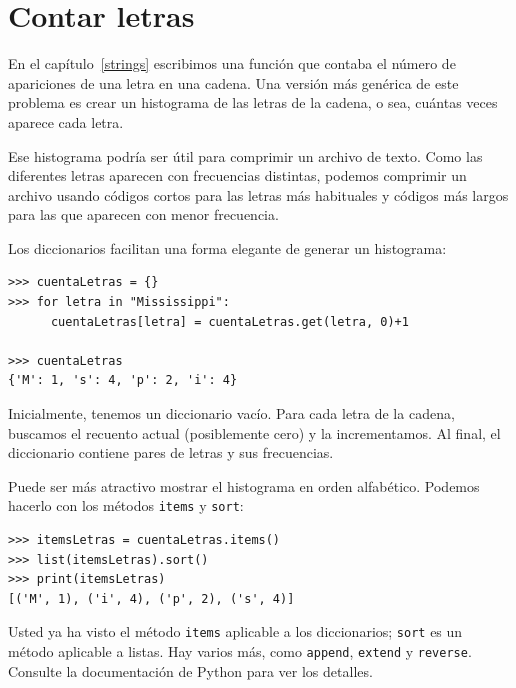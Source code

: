  

\section{Contar letras}

  

En el capítulo~\ref{strings} escribimos una función que contaba
el número de apariciones de una letra en una cadena. Una versión más
genérica de este problema es crear un histograma de las letras de
la cadena, o sea, cuántas veces aparece cada letra.

Ese histograma podría ser útil para comprimir un archivo de texto.
Como las diferentes letras aparecen con frecuencias distintas, podemos
comprimir un archivo usando códigos cortos para las letras más habituales
y códigos más largos para las que aparecen con menor frecuencia.

Los diccionarios facilitan una forma elegante de generar un histograma:
\begin{lstlisting}
>>> cuentaLetras = {}
>>> for letra in "Mississippi":
      cuentaLetras[letra] = cuentaLetras.get(letra, 0)+1

>>> cuentaLetras
{'M': 1, 's': 4, 'p': 2, 'i': 4}
\end{lstlisting}
Inicialmente, tenemos un diccionario vacío. Para cada letra de la
cadena, buscamos el recuento actual (posiblemente cero) y la incrementamos.
Al final, el diccionario contiene pares de letras y sus frecuencias.

Puede ser más atractivo mostrar el histograma en orden alfabético.
Podemos hacerlo con los métodos \texttt{items} y \texttt{sort}:
\begin{lstlisting}
>>> itemsLetras = cuentaLetras.items()
>>> list(itemsLetras).sort()
>>> print(itemsLetras)
[('M', 1), ('i', 4), ('p', 2), ('s', 4)]
\end{lstlisting}
Usted ya ha visto el método \texttt{items} aplicable a los diccionarios;
\texttt{sort} es un método aplicable a listas. Hay varios más, como
\texttt{append}, \texttt{extend} y \texttt{reverse}. Consulte la documentación
de Python para ver los detalles.

 

